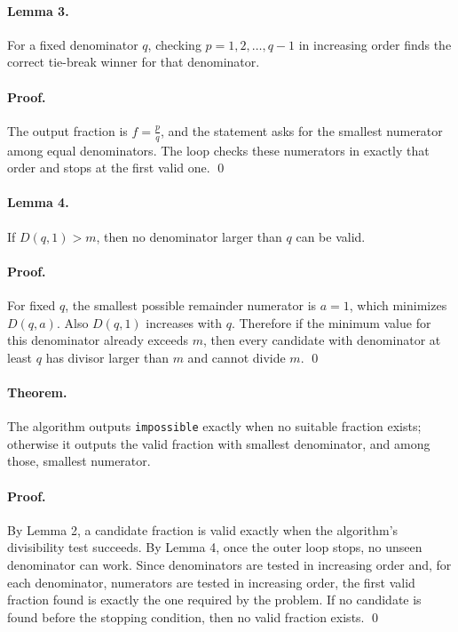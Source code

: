 \documentclass[11pt]{article}
\begin{document}
\paragraph{Lemma 3.}
For a fixed denominator $q$, checking $p=1,2,\dots,q-1$ in increasing order finds the correct tie-break
winner for that denominator.

\paragraph{Proof.}
The output fraction is $f=\frac{p}{q}$, and the statement asks for the smallest numerator among equal
denominators. The loop checks these numerators in exactly that order and stops at the first valid one. \qed

\paragraph{Lemma 4.}
If $D(q,1) > m$, then no denominator larger than $q$ can be valid.

\paragraph{Proof.}
For fixed $q$, the smallest possible remainder numerator is $a=1$, which minimizes $D(q,a)$. Also
$D(q,1)$ increases with $q$. Therefore if the minimum value for this denominator already exceeds $m$, then
every candidate with denominator at least $q$ has divisor larger than $m$ and cannot divide $m$. \qed

\paragraph{Theorem.}
The algorithm outputs \texttt{impossible} exactly when no suitable fraction exists; otherwise it outputs the
valid fraction with smallest denominator, and among those, smallest numerator.

\paragraph{Proof.}
By Lemma 2, a candidate fraction is valid exactly when the algorithm's divisibility test succeeds. By
Lemma 4, once the outer loop stops, no unseen denominator can work. Since denominators are tested in
increasing order and, for each denominator, numerators are tested in increasing order, the first valid
fraction found is exactly the one required by the problem. If no candidate is found before the stopping
condition, then no valid fraction exists. \qed
\end{document}
